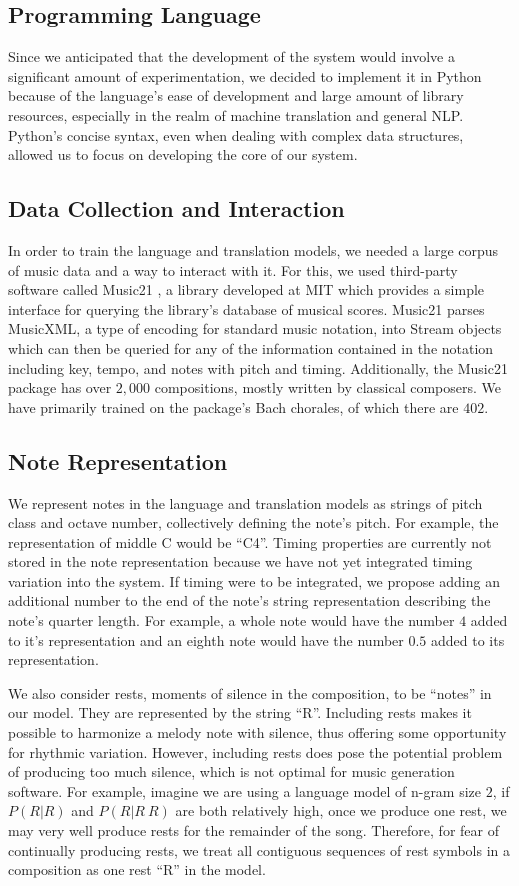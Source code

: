 \documentclass{sig-alternate}
\begin{document}
\subsection{Programming Language}
Since we anticipated that the development of the system would involve a significant amount of experimentation, we decided to implement it in Python because of the language's ease of development and large amount of library resources, especially in the realm of machine translation and general NLP. Python's concise syntax, even when dealing with complex data structures, allowed us to focus on developing the core of our system.

\subsection{Data Collection and Interaction}
In order to train the language and translation models, we needed a large corpus of music data and a way to interact with it. For this,
we used third-party software called Music21 \cite{Cuthbert_music21:a}, a library developed at MIT which provides a simple interface for querying the library's database of musical scores. Music21 parses MusicXML, a type of encoding for standard music notation, into Stream objects which can then be queried for any of the information contained in the notation including key, tempo, and notes with pitch and timing. Additionally, the Music21 package has over $2,000$ compositions, mostly written by classical composers. We have primarily trained on the package's Bach chorales, of which there are $402$.

\subsection{Note Representation}
We represent notes in the language and translation models as strings of pitch class and octave number, collectively defining the note's pitch. For example, the representation of middle C would be ``C4''. Timing properties are currently not stored in the note representation because we have not yet integrated timing variation into the system. If timing were to be integrated, we propose adding an additional number to the end of the note's string representation describing the note's quarter length. For example, a whole note would have the number $4$ added to it's representation and an eighth note would have the number $0.5$ added to its representation. 

We also consider rests, moments of silence in the composition, to be ``notes'' in our model. They are represented by the string ``R''. Including rests makes it possible to harmonize a melody note with silence, thus offering some opportunity for rhythmic variation. However, including rests does pose the potential problem of producing too much silence, which is not optimal for music generation software. For example, imagine we are using a language model of n-gram size $2$, if $P(R | R)$ and $P (R | R\ R)$ are both relatively high, once we produce one rest, we may very well produce rests for the remainder of the song. Therefore, for fear of continually producing rests, we treat all contiguous sequences of rest symbols in a composition as one rest ``R'' in the model.
\end{document}
